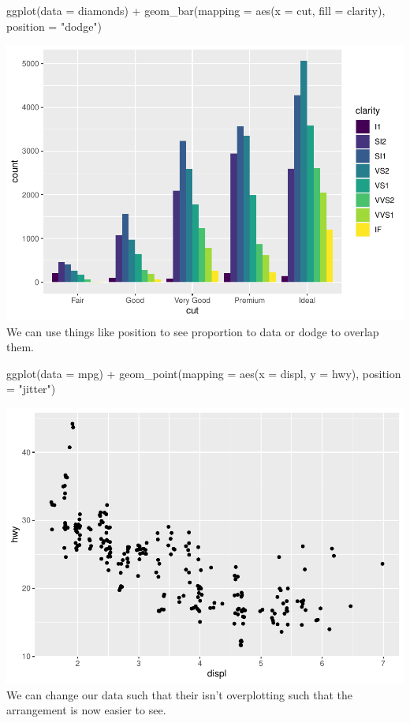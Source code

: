\documentclass[
]{article}
\newenvironment{Shaded}{\begin{snugshade}}{\end{snugshade}}
\newcommand{\AttributeTok}[1]{\textcolor[rgb]{0.77,0.63,0.00}{#1}}
\newcommand{\FunctionTok}[1]{\textcolor[rgb]{0.00,0.00,0.00}{#1}}
\newcommand{\NormalTok}[1]{#1}
\newcommand{\SpecialCharTok}[1]{\textcolor[rgb]{0.00,0.00,0.00}{#1}}
\newcommand{\StringTok}[1]{\textcolor[rgb]{0.31,0.60,0.02}{#1}}
\begin{document}
\begin{Shaded}
\begin{Highlighting}[]
\FunctionTok{ggplot}\NormalTok{(}\AttributeTok{data =}\NormalTok{ diamonds) }\SpecialCharTok{+} 
  \FunctionTok{geom\_bar}\NormalTok{(}\AttributeTok{mapping =} \FunctionTok{aes}\NormalTok{(}\AttributeTok{x =}\NormalTok{ cut, }\AttributeTok{fill =}\NormalTok{ clarity), }\AttributeTok{position =} \StringTok{"dodge"}\NormalTok{)}
\end{Highlighting}
\end{Shaded}

\includegraphics{Journal_files/figure-latex/unnamed-chunk-49-2.pdf} We
can use things like position to see proportion to data or dodge to
overlap them.

\begin{Shaded}
\begin{Highlighting}[]
\FunctionTok{ggplot}\NormalTok{(}\AttributeTok{data =}\NormalTok{ mpg) }\SpecialCharTok{+} 
  \FunctionTok{geom\_point}\NormalTok{(}\AttributeTok{mapping =} \FunctionTok{aes}\NormalTok{(}\AttributeTok{x =}\NormalTok{ displ, }\AttributeTok{y =}\NormalTok{ hwy), }\AttributeTok{position =} \StringTok{"jitter"}\NormalTok{)}
\end{Highlighting}
\end{Shaded}

\includegraphics{Journal_files/figure-latex/unnamed-chunk-50-1.pdf} We
can change our data such that their isn't overplotting such that the
arrangement is now easier to see.
\end{document}
